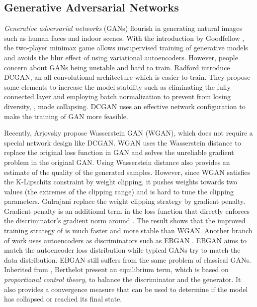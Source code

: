 \documentclass[10pt,twocolumn,letterpaper]{article}
\begin{document}
\subsection{Generative Adversarial Networks}

{\em Generative adversarial networks} (GANs) flourish in generating natural images such as human faces and indoor scenes. With the introduction by Goodfellow \etal \cite{GoodfellowPMXWOCB14}, the two-player minimax game allows unsupervised training of generative models and avoids the blur effect of using variational autoencoders. However, people concern about GANs being unstable and hard to train. Radford \etal \cite{RadfordMC15} introduce DCGAN, an all convolutional architecture which is easier to train. They propose some elements to increase the model stability such as eliminating the fully connected layer and employing batch normalization to prevent from losing diversity, \ie, mode collapsing.
DCGAN uses an effective network configuration to make the training of GAN more feasible. 

Recently, Arjovsky \etal \cite{ArjovskyCB17} propose Wasserstein GAN (WGAN), which does not require a special network design like DCGAN. WGAN uses the Wasserstein distance to replace the original loss function in GAN and solves the unreliable gradient problem in the original GAN. Using Wasserstein distance also provides an estimate of the quality of the generated samples. However, since WGAN satisfies the K-Lipschitz constraint by weight clipping, it pushes weights towards two values (the extremes of the clipping range) and is hard to tune the clipping parameters. 
Gulrajani \etal \cite{GulrajaniAADC17} replace the weight clipping strategy by gradient penalty. Gradient penalty is an additional term in the loss function that directly enforces the discriminator's gradient norm around . The result shows that the improved training strategy of \cite{GulrajaniAADC17} is much faster and more stable than WGAN. Another branch of work uses autoencoders as discriminators such as EBGAN \cite{ZhaoML16}. EBGAN aims to match the autoencoder loss distribution while typical GANs try to match the data distribution. EBGAN still suffers from the same problem of classical GANs. Inherited from \cite{ZhaoML16}, Berthelot \etal \cite{BerthelotSM17} present an equilibrium term, which is based on {\em proportional control theory}, to balance the discriminator and the generator. It also provides a convergence measure that can be used to determine if the model has collapsed or reached its final state.
\end{document}
